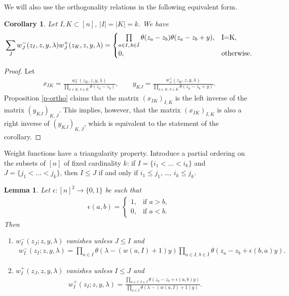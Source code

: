\documentclass[pdftex]{sigma}
\numberwithin{equation}{section}
\newtheorem{Corollary}[Theorem]{Corollary}
\newtheorem{Lemma}[Theorem]{Lemma}
\begin{document}
We will also use the orthogonality relations in the following equivalent form.
\begin{Corollary} \label{p-ortho2} Let $I,K\subset [n]$, $|I|=|K|=k$. We have
\begin{gather*}
\sum_J w^-_J(z_I,z,y,\lambda) w_J^+(z_K,z,y,\lambda)=
\begin{cases} \prod\limits_{a\in I,\,b\in\bar I}\theta(z_a-z_b)\theta(z_a-z_b+y),& $I=K$,\\
0,& \text{otherwise}.
\end{cases}
\end{gather*}
\end{Corollary}
\begin{proof}Let
\begin{gather*}
x_{IK} =\frac{w^-_I(z_K,z,y,\lambda)}{\prod\limits_{a\in K, \, b\in \bar{K}} \theta(z_a-z_b)}, \qquad
y_{KJ} =\frac{w^+_J(z_K,z,y,\lambda)}{\prod\limits_{a\in K, \, b\in \bar{K}} \theta(z_a-z_b+y)}.
\end{gather*}
Proposition \ref{p-ortho} claims that the matrix $(x_{IK})_{I,K}$ is the left inverse of the matrix $(y_{KJ})_{K,J}$. This implies, however, that the matrix $(x_{IK})_{I,K}$ is also a right inverse of $(y_{KJ})_{K,J}$, which is equivalent to the statement of the corollary.
 \end{proof}

Weight functions have a triangularity property. Introduce a partial ordering on the subsets of $[n]$ of fixed cardinality $k$: if $I=\{i_1<\dots<i_k\}$ and $J=\{j_1<\dots<j_k\}$, then $I\leq J$ if and only if $i_1\leq j_1$, \dots, $i_k\leq j_k$.
\begin{Lemma}\label{lemma-5} Let $\epsilon\colon[n]^2\to\{0,1\}$ be such that
 \begin{gather*}
 \epsilon(a,b)=\begin{cases}1,&\text{if $a>b$},\\
 0,&\text{if $a<b$.}
 \end{cases}
 \end{gather*}
 Then
 \begin{enumerate}\itemsep=0pt
 \item[$(i)$] $w_I^-(z_J;z,y,\lambda)$ vanishes unless $J\leq I$ and
 \begin{gather*}
 w_I^-(z_I;z,y,\lambda)=\prod_{a\in I}\theta(\lambda-(w(a,I)+1)y)\prod_{a\in I,\, b\in \bar I}\theta(z_a-z_b+\epsilon(b,a)y).
 \end{gather*}
 \item[$(ii)$] $w_I^+(z_J,z,y,\lambda)$ vanishes unless $I\leq J$ and
 \begin{gather*}
 w_I^+(z_I;z,y,\lambda)=\frac {\prod\limits_{a\in I,\,b\in \bar I}\theta(z_a-z_b+\epsilon(a,b)y)} {\prod\limits_{a\in I}\theta(\lambda-(w(a,I)+1)y)}.
 \end{gather*}
 \end{enumerate}
\end{Lemma}
\end{document}
